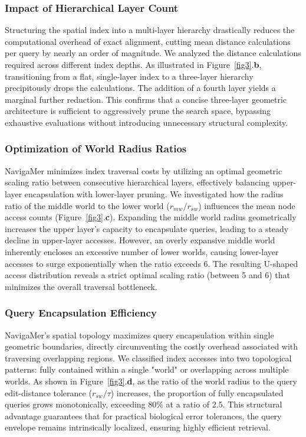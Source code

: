 \documentclass[unnumsec,webpdf,contemporary,large]{oup-authoring-template}%
\theoremstyle{thmstyleone}%
\theoremstyle{thmstyletwo}%
\theoremstyle{thmstylethree}%
\begin{document}
\subsubsection{Impact of Hierarchical Layer Count}
Structuring the spatial index into a multi-layer hierarchy drastically reduces the computational overhead of exact alignment, cutting mean distance calculations per query by nearly an order of magnitude. We analyzed the distance calculations required across different index depths. As illustrated in Figure~\ref{fig3}.\textbf{b}, transitioning from a flat, single-layer index to a three-layer hierarchy precipitously drops the calculations. The addition of a fourth layer yields a marginal further reduction. This confirms that a concise three-layer geometric architecture is sufficient to aggressively prune the search space, bypassing exhaustive evaluations without introducing unnecessary structural complexity.

\subsubsection{Optimization of World Radius Ratios}
NavigaMer minimizes index traversal costs by utilizing an optimal geometric scaling ratio between consecutive hierarchical layers, effectively balancing upper-layer encapsulation with lower-layer pruning. We investigated how the radius ratio of the middle world to the lower world ($r_{mw} / r_{sw}$) influences the mean node access counts (Figure~\ref{fig3}.\textbf{c}). Expanding the middle world radius geometrically increases the upper layer's capacity to encapsulate queries, leading to a steady decline in upper-layer accesses. However, an overly expansive middle world inherently encloses an excessive number of lower worlds, causing lower-layer accesses to surge exponentially when the ratio exceeds 6. The resulting U-shaped access distribution reveals a strict optimal scaling ratio (between 5 and 6) that minimizes the overall traversal bottleneck.

\subsubsection{Query Encapsulation Efficiency}
NavigaMer's spatial topology maximizes query encapsulation within single geometric boundaries, directly circumventing the costly overhead associated with traversing overlapping regions. We classified index accesses into two topological patterns: fully contained within a single "world" or overlapping across multiple worlds. As shown in Figure~\ref{fig3}.\textbf{d}, as the ratio of the world radius to the query edit-distance tolerance ($r_{sw} / \tau$) increases, the proportion of fully encapsulated queries grows monotonically, exceeding 80\% at a ratio of 2.5. This structural advantage guarantees that for practical biological error tolerances, the query envelope remains intrinsically localized, ensuring highly efficient retrieval.
\end{document}
